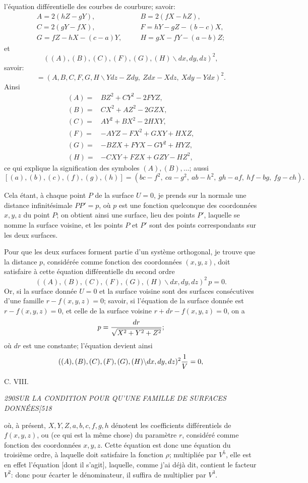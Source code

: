 \documentclass[11pt]{article}
\newcommand{\phead}[3]{\noindent\textit{#1\hfill #2\hfill #3}\par\medskip}
\newcommand{\qform}[2]{(#1\backslash #2)^2}
\begin{document}
l'\'equation diff\'erentielle des courbes de courbure; savoir:
\[
\begin{array}{lll}
A=2(hZ-gY),&\quad&B=2(fX-hZ),\\
C=2(gY-fX),&&F=hY-gZ-(b-c)X,\\
G=fZ-hX-(c-a)Y,&&H=gX-fY-(a-b)Z;
\end{array}
\]
et
\[
\qform{(A),(B),(C),(F),(G),(H)}{dx,dy,dz},
\]
savoir:
\[
=\qform{A,B,C,F,G,H}{Ydz-Zdy,\ Zdx-Xdz,\ Xdy-Ydx}.
\]
Ainsi
\[
\begin{array}{rl}
(A)=&BZ^2+CY^2-2FYZ,\\
(B)=&CX^2+AZ^2-2GZX,\\
(C)=&AY^2+BX^2-2HXY,\\
(F)=&-AYZ-FX^2+GXY+HXZ,\\
(G)=&-BZX+FYX-GY^2+HYZ,\\
(H)=&-CXY+FZX+GZY-HZ^2,
\end{array}
\]
ce qui explique la signification des symboles $(A),(B),\ldots$; aussi
\[
[(a),(b),(c),(f),(g),(h)]=(bc-f^2,\ ca-g^2,\ ab-h^2,\ gh-af,\ hf-bg,\ fg-ch).
\]

Cela \'etant, \`a chaque point $P$ de la surface $U=0$, je prends sur la normale une
distance infinit\'esimale $PP'=p$, o\`u $p$ est une fonction quelconque des coordonn\'ees
$x,y,z$ du point $P$; on obtient ainsi une surface, lieu des points $P'$, laquelle se
nomme la surface voisine, et les points $P$ et $P'$ sont des points correspondants sur
les deux surfaces.

Pour que les deux surfaces forment partie d'un syst\`eme orthogonal, je trouve que la
distance $p$, consid\'er\'ee comme fonction des coordonn\'ees $(x,y,z)$, doit satisfaire \`a
cette \'equation diff\'erentielle du second ordre
\[
\qform{(A),(B),(C),(F),(G),(H)}{dx,dy,dz}\,p=0.
\]
Or, si la surface donn\'ee $U=0$ et la surface voisine sont des surfaces cons\'ecutives
d'une famille $r-f(x,y,z)=0$; savoir, si l'\'equation de la surface donn\'ee est
$r-f(x,y,z)=0$, et celle de la surface voisine $r+dr-f(x,y,z)=0$, on a
\[
p={dr\over\sqrt{X^2+Y^2+Z^2}};
\]
o\`u $dr$ est une constante; l'\'equation devient ainsi
\[
\qform{(A),(B),(C),(F),(G),(H)}{dx,dy,dz}{1\over V}=0,
\]

\hfill C. VIII.
\clearpage

\phead{290}{SUR LA CONDITION POUR QU'UNE FAMILLE DE SURFACES DONN\'EES}{[518}

o\`u, \`a pr\'esent, $X,Y,Z,a,b,c,f,g,h$ d\'enotent les coefficients diff\'erentiels de
$f(x,y,z)$, ou (ce qui est la m\^eme chose) du param\`etre $r$, consid\'er\'e comme fonction
des coordonn\'ees $x,y,z$. Cette \'equation est donc une \'equation du troisi\`eme ordre,
\`a laquelle doit satisfaire la fonction $\rho$; multipli\'ee par $V^5$, elle est en effet
l'\'equation [dont il s'agit], laquelle, comme j'ai d\'ej\`a dit, contient le facteur $V^2$:
donc pour \'ecarter le d\'enominateur, il suffira de multiplier par $V^3$.
\end{document}
